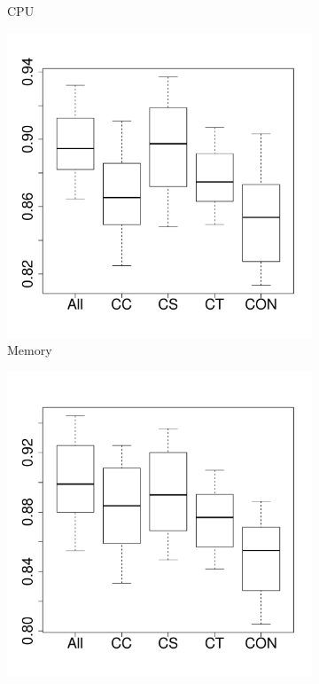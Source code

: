 \begin{figure}[t]
\begin{subfigure}{0.19\textwidth}
                \caption{CPU}
        \end{subfigure}%
        \begin{subfigure}{0.19\textwidth}
                \includegraphics[width=\linewidth]{Figures/mem-hadoopremove-importance.pdf}
                \caption{Memory}
        \end{subfigure}%
        \begin{subfigure}{0.19\textwidth}
                \includegraphics[width=\linewidth]{Figures/ioread-hadoopremove-importance.pdf}

\end{subfigure}
\end{figure}

